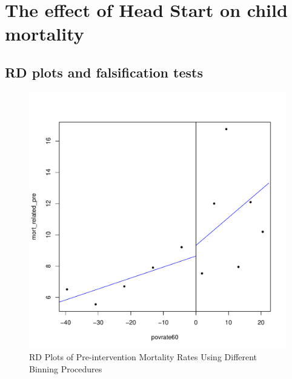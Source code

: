 \documentclass[12pt]{article}
\begin{document}
\newpage

\section{The effect of Head Start on child mortality}

\subsection{RD plots and falsification tests}
\begin{figure}[htpb!]
    \centering
    \caption{RD Plots of Pre-intervention Mortality Rates Using Different Binning Procedures}
    \begin{minipage}{0.5\textwidth}
        \includegraphics[width=1\textwidth]{q2-1-es.pdf}
    \end{minipage}\hfill
    \begin{minipage}{0.5\textwidth}

\end{minipage}
\end{figure}
\end{document}
